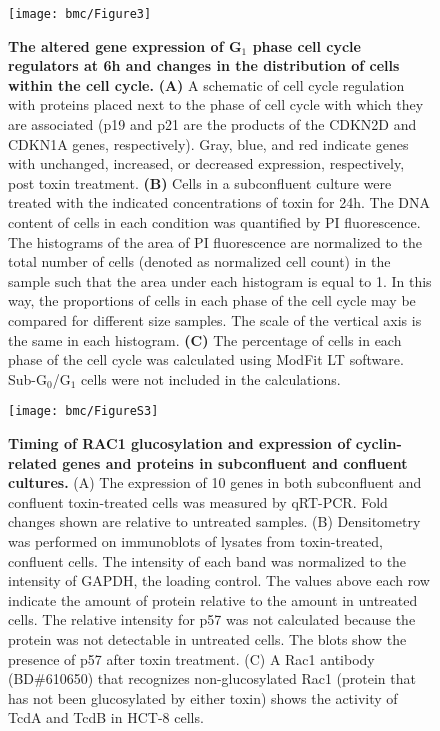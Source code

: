 \begin{figure}[h!]
  \centering
  \texttt{[image: bmc/Figure3]}
  \caption[The altered gene expression of 
  G$_{\text{1}}$ phase cell cycle regulators 
  at 6h and changes in the distribution of cells 
  within the cell cycle]{
  \textbf{The altered gene expression of 
  G$_{\text{1}}$ phase cell cycle regulators 
  at 6h and changes in the distribution of cells 
  within the cell cycle.}
  \textbf{(A)} A schematic of cell cycle regulation 
  with proteins placed next to the phase of cell cycle 
  with which they are associated (p19 and p21 are the 
  products of the CDKN2D and CDKN1A genes, respectively). 
  Gray, blue, and red indicate genes with unchanged, 
  increased, or decreased expression, respectively, 
  post toxin treatment.
  \textbf{(B)} Cells in a subconfluent culture were 
  treated with the indicated concentrations of toxin 
  for 24h. The DNA content of cells in each condition 
  was quantified by PI fluorescence. The histograms 
  of the area of PI fluorescence are normalized to the 
  total number of cells (denoted as normalized cell count) 
  in the sample such that the area under each histogram 
  is equal to 1. In this way, the proportions of cells in 
  each phase of the cell cycle may be compared for different 
  size samples. The scale of the vertical axis is the same 
  in each histogram.
  \textbf{(C)} The percentage of cells in each phase of 
  the cell cycle was calculated using ModFit LT software. 
  Sub-G$_{\text{0}}$/G$_{\text{1}}$ cells were not included 
  in the calculations.
}
  \label{bmc:fig3}
\end{figure}

\begin{figure}[h!]
  \centering
  \texttt{[image: bmc/FigureS3]}
  \caption[Timing of RAC1 glucosylation and expression of 
             cyclin-related genes and proteins in
             subconfluent and confluent cultures.]{
  \textbf{Timing of RAC1 glucosylation and expression of 
             cyclin-related genes and proteins in
             subconfluent and confluent cultures.}
  (A) The expression of 10 genes in both subconfluent
   and confluent toxin-treated cells was measured 
  by qRT-PCR. Fold changes shown are relative 
  to untreated samples.
  (B) Densitometry was performed on immunoblots 
  of lysates from toxin-treated, confluent cells. The 
  intensity of each band was normalized to the intensity 
  of GAPDH, the loading control. The values 
  above each row indicate the amount of protein relative 
  to the amount in untreated cells. The relative 
  intensity for p57 was not calculated because the protein 
  was not detectable in untreated cells. The 
  blots show the presence of p57 after toxin treatment.
  (C) A Rac1 antibody (BD\#610650) that recognizes 
  non-glucosylated Rac1 (protein that has not been 
  glucosylated by either toxin) shows the activity of 
  TcdA and TcdB in HCT-8 cells. }
  \label{bmc:figs3}
\end{figure}

